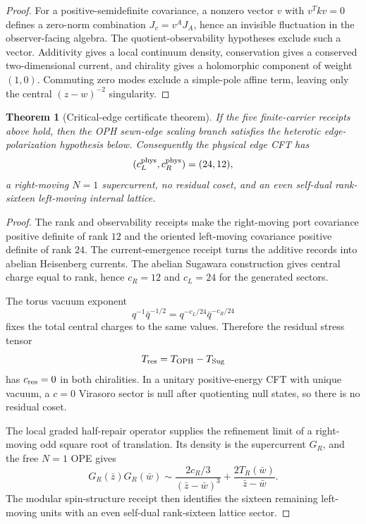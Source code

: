 \documentclass[11pt]{article}
\newtheorem{theorem}{Theorem}[section]
\theoremstyle{remark}
\theoremstyle{plain}
\newcommand{\OPH}{\mathrm{OPH}}
\begin{document}
\begin{proof}
For a positive-semidefinite covariance, a nonzero vector \(v\) with \(v^Tkv=0\) defines a zero-norm
combination \(J_v=v^AJ_A\), hence an invisible fluctuation in the observer-facing algebra. The
quotient-observability hypotheses exclude such a vector. Additivity gives a local continuum
density, conservation gives a conserved two-dimensional current, and chirality gives a holomorphic
component of weight \((1,0)\). Commuting zero modes exclude a simple-pole affine term, leaving only
the central \((z-w)^{-2}\) singularity.
\end{proof}

\begin{theorem}[Critical-edge certificate theorem]
If the five finite-carrier receipts above hold, then the OPH sewn-edge scaling branch satisfies the
heterotic edge-polarization hypothesis below. Consequently the physical edge CFT has
\[
(c_L^{\rm phys},c_R^{\rm phys})=(24,12),
\]
a right-moving \(N=1\) supercurrent, no residual coset, and an even self-dual rank-sixteen
left-moving internal lattice.
\end{theorem}

\begin{proof}
The rank and observability receipts make the right-moving port covariance positive definite of
rank \(12\) and the oriented left-moving covariance positive definite of rank \(24\). The
current-emergence receipt turns the additive records into abelian Heisenberg currents. The abelian
Sugawara construction gives central charge equal to rank, hence \(c_R=12\) and \(c_L=24\) for the
generated sectors.

The torus vacuum exponent
\[
q^{-1}\bar q^{-1/2}=q^{-c_L/24}\bar q^{-c_R/24}
\]
fixes the total central charges to the same values. Therefore the residual stress tensor
\[
T_{\rm res}=T_{\OPH}-T_{\rm Sug}
\]
has \(c_{\rm res}=0\) in both chiralities. In a unitary positive-energy CFT with unique vacuum, a
\(c=0\) Virasoro sector is null after quotienting null states, so there is no residual coset.

The local graded half-repair operator supplies the refinement limit of a right-moving odd square
root of translation. Its density is the supercurrent \(G_R\), and the free \(N=1\) OPE gives
\[
G_R(\bar z)G_R(\bar w)
\sim
\frac{2c_R/3}{(\bar z-\bar w)^3}
+
\frac{2T_R(\bar w)}{\bar z-\bar w}.
\]
The modular spin-structure receipt then identifies the sixteen remaining left-moving units with an
even self-dual rank-sixteen lattice sector.
\end{proof}
\end{document}
